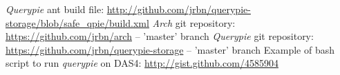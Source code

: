 \begin{thebibliography}{99}
		{\emph{Querypie} ant build file: \url{http://github.com/jrbn/querypie-storage/blob/safe_qpie/build.xml}}
		{\emph{Arch} git repository: \url{https://github.com/jrbn/arch} -- 'master' branch}
		{\emph{Querypie} git repository: \url{https://github.com/jrbn/querypie-storage} -- 'master' branch}
		{Example of bash script to run \emph{querypie} on DAS4: \url{http://gist.github.com/4585904}}
\end{thebibliography}
